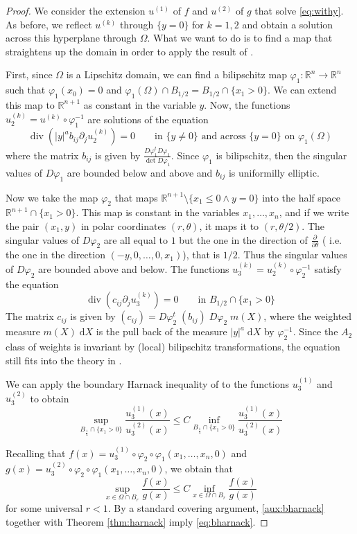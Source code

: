 \documentclass[letterpaper]{article}
\numberwithin{equation}{section}
\newcommand{\R}{\mathbb R}
\newcommand{\dd} {\; \mathrm{d}}
\DeclareMathOperator{\dv}{div}
\begin{document}
\begin{proof}
We consider the extension $u^{(1)}$ of $f$ and $u^{(2)}$ of $g$ that solve \eqref{eq:withy}. As before, we reflect $u^{(k)}$ through $\{y=0\}$ for $k=1,2$ and obtain a solution across this hyperplane through $\Omega$. What we want to do is to find a map that straightens up the domain in order to apply the result of \cite{FKJ}.

First, since $\Omega$ is a Lipschitz domain, we can find a bilipschitz map $\varphi_1: \R^n \to \R^n$ such that $\varphi_1(x_0)=0$ and $\varphi_1(\Omega) \cap B_{1/2} = B_{1/2} \cap \{ x_1 > 0\}$. We can extend this map to $\R^{n+1}$ as constant in the variable $y$. Now, the functions $u^{(k)}_2 = u^{(k)} \circ \varphi_1^{-1}$ are solutions of the equation
\[ \dv( |y|^a b_{ij} \partial_j u^{(k)}_2) = 0 \qquad \text{in $\{y \neq 0\}$ and across $\{y=0\}$ on $\varphi_1(\Omega)$}\]
where the matrix $b_{ij}$ is given by $\frac{D\varphi_1^t D\varphi_1}{\det D\varphi_1}$. Since $\varphi_1$ is bilipschitz, then the singular values of $D\varphi_1$ are bounded below and above and $b_{ij}$ is uniformilly elliptic.

Now we take the map $\varphi_2$ that maps $\R^{n+1} \setminus \{x_1 \leq 0 \wedge y=0\}$ into the half space $\R^{n+1} \cap \{x_1 >0\}$. This map is constant in the variables $x_1,\dots,x_n$, and if we write the pair $(x_1,y)$ in polar coordinates $(r,\theta)$, it maps it to $(r,\theta/2)$. The singular values of $D \varphi_2$ are all equal to $1$ but the one in the direction of $\frac{\partial}{\partial \theta}$ ( i.e. the one in the direction $(-y,0,\dots,0,x_1)$), that is $1/2$. Thus the singular values of $D\varphi_2$ are bounded above and below. The functions $u^{(k)}_3 = u^{(k)}_2 \circ \varphi_2^{-1}$ satisfy the equation
\[ \dv( c_{ij} \partial_j u^{(k)}_3) = 0 \qquad \text{in $B_{1/2} \cap \{x_1 > 0\}$} \]
The matrix $c_{ij}$ is given by $(c_{ij}) = D\varphi_2^t \; (b_{ij}) \; D\varphi_2 \; m(X)$, where the weighted measure $m(X) \dd X$ is the pull back of the measure $|y|^a \dd X$ by $\varphi_2^{-1}$. Since the $A_2$ class of weights is invariant by (local) bilipschitz transformations, the equation still fits into the theory in \cite{FKJ}.

We can apply the boundary Harnack inequality of \cite{FKJ} to the functions $u^{(1)}_3$ and $u^{(2)}_3$ to obtain
\[ \sup_{B_{\frac 1 4} \cap \{x_1 > 0\}} \frac{u^{(1)}_3(x)}{u^{(2)}_3(x)} \leq C \inf_{B_{\frac 1 4} \cap \{x_1 > 0\}} \frac{u^{(1)}_3(x)}{u^{(2)}_3(x)}\]

Recalling that $f(x) = u^{(1)}_3 \circ \varphi_2 \circ \varphi_1 (x_1, \dots, x_n,0)$ and $g(x) = u^{(2)}_3 \circ \varphi_2 \circ \varphi_1 (x_1, \dots, x_n,0)$, we obtain that
\begin{equation} \label{aux:bharnack}
 \sup_{x \in \Omega \cap B_r} \frac{f(x)}{g(x)} \leq C \inf_{x \in \Omega \cap B_r} \frac{f(x)}{g(x)}
\end{equation}
for some universal $r<1$. By a standard covering argument, \eqref{aux:bharnack} together with Theorem \ref{thm:harnack} imply \eqref{eq:bharnack}.
\end{proof}
\end{document}
